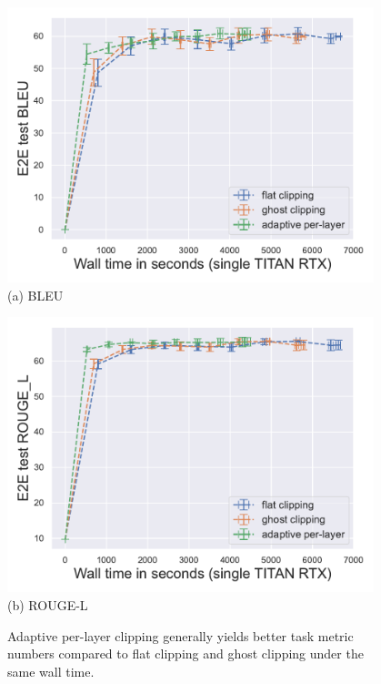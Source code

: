 \begin{figure}[htb]
\begin{center}
\begin{minipage}[t]{0.45\linewidth}
\centering
{\includegraphics[width=0.95\textwidth]{files/fig/walltime_e2e_test_bleu.pdf}} \\
(a) BLEU
\end{minipage}
\begin{minipage}[t]{0.45\linewidth}
\centering
{\includegraphics[width=0.95\textwidth]{files/fig/walltime_e2e_test_ROUGE_L.pdf}} \\
(b) ROUGE-L
\end{minipage}
\end{center}
\caption{
Adaptive per-layer clipping generally yields better task metric numbers compared to flat clipping and ghost clipping under the same wall time.
}
\label{fig:gpt2runtime-overall-task-metric}
\end{figure}



